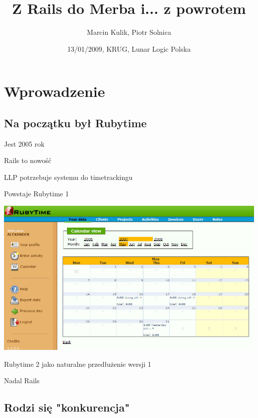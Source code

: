 \documentclass[19pt]{beamer}
\title{Z Rails do Merba i... z powrotem}
\author{Marcin Kulik, Piotr Solnica}
\date{13/01/2009, KRUG, Lunar Logic Polska}
\begin{document}
\begin{center}

\frame{\titlepage}

\section[Outline]{}
\frame{\tableofcontents}

\section{Wprowadzenie}
\subsection{Na początku był Rubytime}

\begin{frame}
Jest 2005 rok

Rails to nowość
\end{frame}

\begin{frame}
LLP potrzebuje systemu do timetrackingu

Powstaje Rubytime 1
\end{frame}

\begin{frame}
\includegraphics[width=1.0\textwidth]{rt1.jpg} 
\end{frame}

\begin{frame}
Rubytime 2 jako naturalne przedłużenie wersji 1

Nadal Rails
\end{frame}

\subsection{Rodzi się "konkurencja"}


\end{center}
\end{document}
